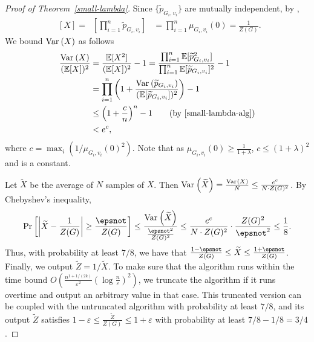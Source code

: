 \documentclass{theoretics}
\newcommand{\Ex}{\mathop{\mathbb{{}E}}\nolimits}
\renewcommand{\Pr}{\mathop{\mathrm{Pr}}\nolimits}
\newcommand{\abs}[1]{\ensuremath{\left\vert#1\right\vert}}
\newcommand{\eps}{\varepsilon}
\newcommand{\Var}[2]{\ensuremath{\textnormal{Var}_{#1}\left(#2\right)}}
\begin{document}
\begin{proof}[Proof of Theorem~\ref{small-lambda}]
  Since $\{\widetilde{p}_{G_i,v_i}\}$ are mutually independent, by ,
  \begin{align*}
    \Ex[X]=\Ex\left[\prod_{i=1}^n\widetilde{p}_{G_i,v_i}\right] & = \prod_{i=1}^n\mu_{G_i,v_i}(0)=\frac{1}{Z(G)}.
  \end{align*}
  We bound $\Var{}{X}$ as follows
  \begin{align*}
    \frac{\Var{}{X}}{(\Ex[X])^2}&=\frac{\Ex[X^2]}{(\Ex[X])^2}-1 = \frac{\prod_{i=1}^n\Ex[\widetilde{p}_{G_i,v_i}^2]}{\prod_{i=1}^n\Ex[\widetilde{p}_{G_i,v_i}]^2}-1\\
    &=\prod_{i=1}^n\left(1+\frac{\Var{}{\widetilde{p}_{G_i,v_i}}}{(\Ex[\widetilde{p}_{G_i,v_i}])^2}\right)-1\\
    &\leq\left(1+\frac{c}{n}\right)^n-1\tag*{(by \Cref{small-lambda-alg})}\\
    &<e^{c},
  \end{align*}
  where $c=\max_i(1/\mu_{G_i,v_i}(0)^2)$. 
  Note that as $\mu_{G_i,v_i}(0)\ge \frac{1}{1+\lambda}$, $c\le (1+\lambda)^2$ and is a constant.

  Let $\widetilde{X}$ be the average of $N$ samples of $X$.
  Then $\Var{}{\widetilde{X}} = \frac{\Var{}{X}}{N} \le \frac{e^{c}}{N\cdot Z(G)^2}$.
  By Chebyshev's inequality,
  \begin{align*}
    \Pr\left[\abs{\widetilde{X}-\frac{1}{Z(G)}}\ge\frac{\epsnot}{Z(G)}\right]\le\frac{\Var{}{\widetilde{X}}}{\frac{\epsnot^2}{Z(G)^2}} 
    \le \frac{e^{c}}{N\cdot Z(G)^2} \cdot \frac{Z(G)^2}{\epsnot^2}\le \frac{1}{8}.
  \end{align*}
  Thus, with probability at least $7/8$,
  we have that $\frac{1-\epsnot}{Z(G)}\le \widetilde{X} \le \frac{1+\epsnot}{Z(G)}$.
  Finally, we output $\widetilde{Z}=1/\widetilde{X}$.
  To make sure that the algorithm runs within the time bound $O\left(\frac{n^{1+1/(2k)}}{\eps^2}(\log \frac{n}{\eps})^2\right)$, 
  we truncate the algorithm if it runs overtime and output an arbitrary value in that case.
  This truncated version can be coupled with the untruncated algorithm with probability at least $7/8$,
  and its output $\widetilde{Z}$ satisfies $1-\eps\le \frac{\widetilde{Z}}{Z(G)}\le 1+\eps$ with probability at least $7/8-1/8=3/4$.


\end{proof}
\end{document}
